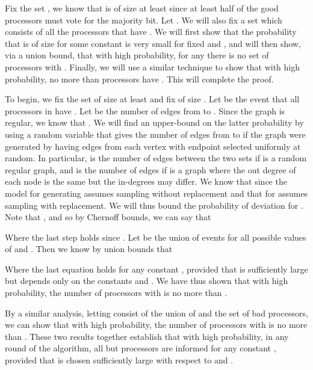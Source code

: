 \documentclass[letterpaper,11pt]{article}
\newcommand{\sq}{\hbox{\rlap{}}}
\newcommand{\qed}{\hspace*{\fill}\sq}
\newenvironment{proof}{\noindent {\bf Proof:}}{\qed\par\vskip 4mm\par}
\begin{document}
\begin{proof}
Fix the set , we know that  is of size at least  since at least half of the good processors must vote for the majority bit.  Let . We will also fix a set  which consists of all the processors that have .  We will first show that the probability that  is of size  for some constant  is very small for fixed  and , and will then show, via a union bound, that with high probability, for any  there is no set of  processors with .  Finally, we will use a similar technique to show that with high probability, no more than  processors have .  This will complete the proof.

To begin, we fix the set  of size at least  and fix  of size .  Let  be the event that all processors in  have .  Let  be the number of edges from  to .  Since the graph  is  regular, we know that .  We will find an upper-bound on the latter probability by using a random variable  that gives the number of edges from  to  if the graph  were generated by having  edges from each vertex with endpoint selected uniformly at random.  In particular,  is the number of edges between the two sets if  is a random regular graph, and  is the number of edges if  is a graph where the out degree of each node is the same but the in-degrees may differ.  We know that  since the model for generating  assumes sampling without replacement and that for  assumes sampling with replacement.  We will thus bound the probability of deviation for .  Note that , and so by Chernoff bounds, we can say that 



Where the last step holds since .  Let  be the union of events  for all possible values of  and .  Then we know by union bounds that



Where the last equation holds for any constant , provided that  is sufficiently large but depends only on the constants  and .  We have thus shown that with high probability, the number of processors with  is no more than .  

By a similar analysis, letting  consist of the union of  and the set of bad processors, we can show that with high probability, the number of processors with  is no more than .  These two results together establish that with high probability, in any round of the algorithm, all but  processors are informed for any constant , provided that  is chosen sufficiently large with respect to  and .
\end{proof}
\end{document}
